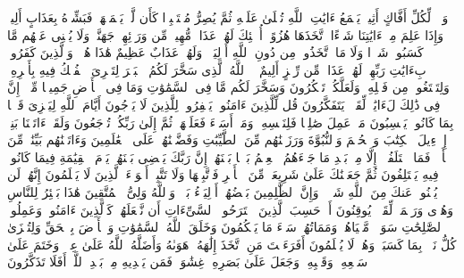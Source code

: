 \stopbuffer
\startbuffer[\q:45:7]
وَیۡلࣱ لِّكُلِّ أَفَّاكٍ أَثِیمࣲ%
\stopbuffer
\startbuffer[\q:45:8]
یَسۡمَعُ ءَایَٰتِ ٱللَّهِ تُتۡلَىٰ عَلَیۡهِ ثُمَّ یُصِرُّ مُسۡتَكۡبِرࣰا كَأَن لَّمۡ یَسۡمَعۡهَاۖ فَبَشِّرۡهُ بِعَذَابٍ أَلِیمࣲ%
\stopbuffer
\startbuffer[\q:45:9]
وَإِذَا عَلِمَ مِنۡ ءَایَٰتِنَا شَیۡءًا ٱتَّخَذَهَا هُزُوًاۚ أُو۟لَٰۤئِكَ لَهُمۡ عَذَابࣱ مُّهِینࣱ%
\stopbuffer
\startbuffer[\q:45:10]
مِّن وَرَاۤئِهِمۡ جَهَنَّمُۖ وَلَا یُغۡنِی عَنۡهُم مَّا كَسَبُوا۟ شَیۡءࣰا وَلَا مَا ٱتَّخَذُوا۟ مِن دُونِ ٱللَّهِ أَوۡلِیَاۤءَۖ وَلَهُمۡ عَذَابٌ عَظِیمٌ%
\stopbuffer
\startbuffer[\q:45:11]
هَٰذَا هُدࣰىۖ وَٱلَّذِینَ كَفَرُوا۟ بِءَایَٰتِ رَبِّهِمۡ لَهُمۡ عَذَابࣱ مِّن رِّجۡزٍ أَلِیمٌ%
\stopbuffer
\startbuffer[\q:45:12]
۞ ٱللَّهُ ٱلَّذِی سَخَّرَ لَكُمُ ٱلۡبَحۡرَ لِتَجۡرِیَ ٱلۡفُلۡكُ فِیهِ بِأَمۡرِهِۦ وَلِتَبۡتَغُوا۟ مِن فَضۡلِهِۦ وَلَعَلَّكُمۡ تَشۡكُرُونَ%
\stopbuffer
\startbuffer[\q:45:13]
وَسَخَّرَ لَكُم مَّا فِی ٱلسَّمَٰوَٰتِ وَمَا فِی ٱلۡأَرۡضِ جَمِیعࣰا مِّنۡهُۚ إِنَّ فِی ذَٰلِكَ لَءَایَٰتࣲ لِّقَوۡمࣲ یَتَفَكَّرُونَ%
\stopbuffer
\startbuffer[\q:45:14]
قُل لِّلَّذِینَ ءَامَنُوا۟ یَغۡفِرُوا۟ لِلَّذِینَ لَا یَرۡجُونَ أَیَّامَ ٱللَّهِ لِیَجۡزِیَ قَوۡمَۢا بِمَا كَانُوا۟ یَكۡسِبُونَ%
\stopbuffer
\startbuffer[\q:45:15]
مَنۡ عَمِلَ صَٰلِحࣰا فَلِنَفۡسِهِۦۖ وَمَنۡ أَسَاۤءَ فَعَلَیۡهَاۖ ثُمَّ إِلَىٰ رَبِّكُمۡ تُرۡجَعُونَ%
\stopbuffer
\startbuffer[\q:45:16]
وَلَقَدۡ ءَاتَیۡنَا بَنِیۤ إِسۡرَٰۤءِیلَ ٱلۡكِتَٰبَ وَٱلۡحُكۡمَ وَٱلنُّبُوَّةَ وَرَزَقۡنَٰهُم مِّنَ ٱلطَّیِّبَٰتِ وَفَضَّلۡنَٰهُمۡ عَلَى ٱلۡعَٰلَمِینَ%
\stopbuffer
\startbuffer[\q:45:17]
وَءَاتَیۡنَٰهُم بَیِّنَٰتࣲ مِّنَ ٱلۡأَمۡرِۖ فَمَا ٱخۡتَلَفُوۤا۟ إِلَّا مِنۢ بَعۡدِ مَا جَاۤءَهُمُ ٱلۡعِلۡمُ بَغۡیَۢا بَیۡنَهُمۡۚ إِنَّ رَبَّكَ یَقۡضِی بَیۡنَهُمۡ یَوۡمَ ٱلۡقِیَٰمَةِ فِیمَا كَانُوا۟ فِیهِ یَخۡتَلِفُونَ%
\stopbuffer
\startbuffer[\q:45:18]
ثُمَّ جَعَلۡنَٰكَ عَلَىٰ شَرِیعَةࣲ مِّنَ ٱلۡأَمۡرِ فَٱتَّبِعۡهَا وَلَا تَتَّبِعۡ أَهۡوَاۤءَ ٱلَّذِینَ لَا یَعۡلَمُونَ%
\stopbuffer
\startbuffer[\q:45:19]
إِنَّهُمۡ لَن یُغۡنُوا۟ عَنكَ مِنَ ٱللَّهِ شَیۡءࣰاۚ وَإِنَّ ٱلظَّٰلِمِینَ بَعۡضُهُمۡ أَوۡلِیَاۤءُ بَعۡضࣲۖ وَٱللَّهُ وَلِیُّ ٱلۡمُتَّقِینَ%
\stopbuffer
\startbuffer[\q:45:20]
هَٰذَا بَصَٰۤئِرُ لِلنَّاسِ وَهُدࣰى وَرَحۡمَةࣱ لِّقَوۡمࣲ یُوقِنُونَ%
\stopbuffer
\startbuffer[\q:45:21]
أَمۡ حَسِبَ ٱلَّذِینَ ٱجۡتَرَحُوا۟ ٱلسَّیِّءَاتِ أَن نَّجۡعَلَهُمۡ كَٱلَّذِینَ ءَامَنُوا۟ وَعَمِلُوا۟ ٱلصَّٰلِحَٰتِ سَوَاۤءࣰ مَّحۡیَاهُمۡ وَمَمَاتُهُمۡۚ سَاۤءَ مَا یَحۡكُمُونَ%
\stopbuffer
\startbuffer[\q:45:22]
وَخَلَقَ ٱللَّهُ ٱلسَّمَٰوَٰتِ وَٱلۡأَرۡضَ بِٱلۡحَقِّ وَلِتُجۡزَىٰ كُلُّ نَفۡسِۭ بِمَا كَسَبَتۡ وَهُمۡ لَا یُظۡلَمُونَ%
\stopbuffer
\startbuffer[\q:45:23]
أَفَرَءَیۡتَ مَنِ ٱتَّخَذَ إِلَٰهَهُۥ هَوَىٰهُ وَأَضَلَّهُ ٱللَّهُ عَلَىٰ عِلۡمࣲ وَخَتَمَ عَلَىٰ سَمۡعِهِۦ وَقَلۡبِهِۦ وَجَعَلَ عَلَىٰ بَصَرِهِۦ غِشَٰوَةࣰ فَمَن یَهۡدِیهِ مِنۢ بَعۡدِ ٱللَّهِۚ أَفَلَا تَذَكَّرُونَ%
